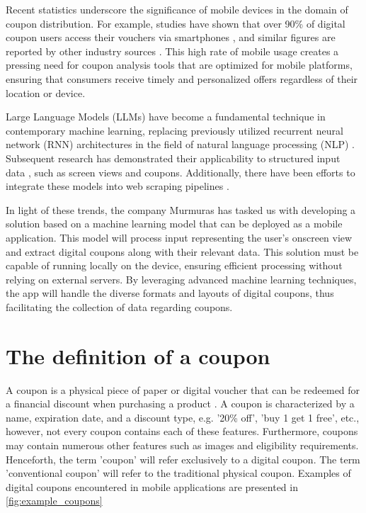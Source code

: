 \documentclass[licencjacka,en]{pracamgr}
\begin{document}
Recent statistics underscore the significance of mobile devices in the domain of coupon distribution. For example, studies have shown that over 90\% of digital coupon users access their vouchers via smartphones \cite{emarketer_coupon_stats}, and similar figures are reported by other industry sources \cite{coupon_stats_2}. This high rate of mobile usage creates a pressing need for coupon analysis tools that are optimized for mobile platforms, ensuring that consumers receive timely and personalized offers regardless of their location or device.

Large Language Models (LLMs) have become a fundamental technique in contemporary machine learning, replacing previously utilized recurrent neural network (RNN) architectures in the field of natural language processing (NLP) \cite{li2024}. Subsequent research has demonstrated their applicability to structured input data \cite{sui2024}, such as screen views and coupons. Additionally, there have been efforts to integrate these models into web scraping pipelines \cite{scapegraph_repo}.

In light of these trends, the company Murmuras has tasked us with developing a solution based on a machine learning model that can be deployed as a mobile application. This model will process input representing the user's onscreen view and extract digital coupons along with their relevant data. This solution must be capable of running locally on the device, ensuring efficient processing without relying on external servers. By leveraging advanced machine learning techniques, the app will handle the diverse formats and layouts of digital coupons, thus facilitating the collection of data regarding coupons.

\section{The definition of a coupon}
A coupon is a physical piece of paper or digital voucher that can be redeemed for a financial discount when purchasing a product \cite{coupon_definition}. A coupon is characterized by a name, expiration date, and a discount type, e.g. '20\% off', 'buy 1 get 1 free', etc., however, not every coupon contains each of these features. Furthermore, coupons may contain numerous other features such as images and eligibility requirements. Henceforth, the term 'coupon' will refer exclusively to a digital coupon. The term 'conventional coupon' will refer to the traditional physical coupon. Examples of digital coupons encountered in mobile applications are presented in \ref{fig:example_coupons}
\end{document}
